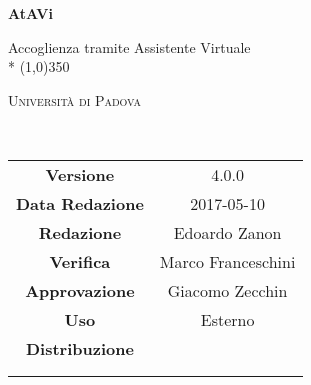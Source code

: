 \documentclass[a4paper,12pt]{article}
\date{2017-05-10}
\begin{document}
	\begin{titlepage}
		\centering
		{\huge\bfseries AtAVi\par}
		Accoglienza tramite Assistente Virtuale \\*
		\line(1,0){350} \\
		{\scshape\LARGE Università di Padova \par}
		\vspace{1cm}
		{\scshape\Large \analisideirequisitiRA\ \par}
		\logo
		\newpage
		\begin{tabular}{c|c}
			{\hfill \textbf{Versione}} 			& 4.0.0						\\ 
			{\hfill\textbf{Data Redazione}} 	& 2017-05-10 		\\ 
			{\hfill\textbf{Redazione}} 			& Edoardo Zanon \\ 
			{\hfill\textbf{Verifica}} 			& Marco Franceschini \\ 
			{\hfill\textbf{Approvazione}} 		& Giacomo Zecchin	\\
			{\hfill\textbf{Uso}} 				& Esterno 				\\
			{\hfill\textbf{Distribuzione}} 		& \vardanega \\ & \cardin \\ & \prop \\
		\end{tabular}
	\end{titlepage}
	
	\pagestyle{myfront}
	\newpage
	
	\newpage
	\tableofcontents
	\newpage
	\listoftables
	\newpage
	\listoffigures
	
	\label{LastFrontPage}	
	\newpage	
	\pagestyle{mymain}
				
	\newpage	
		
	\newpage	
			
	\newpage	
		
		
	\label{LastPage}
\end{document}
